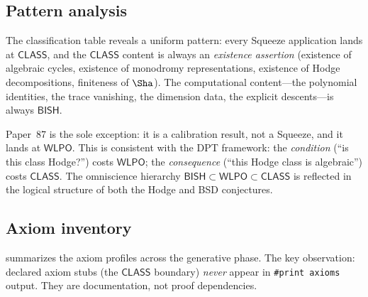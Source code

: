 \documentclass[11pt]{article}
\theoremstyle{plain}
\theoremstyle{definition}
\theoremstyle{remark}
\newcommand{\BISH}{\mathsf{BISH}}
\newcommand{\WLPO}{\mathsf{WLPO}}
\newcommand{\CLASS}{\mathsf{CLASS}}
\begin{document}
\subsection{Pattern analysis}

The classification table reveals a uniform pattern: every Squeeze
application lands at $\CLASS$, and the $\CLASS$ content is always
an \emph{existence assertion} (existence of algebraic cycles,
existence of monodromy representations, existence of Hodge
decompositions, finiteness of
$\Sha$).
The computational content---the polynomial
identities, the trace vanishing, the dimension data, the explicit
descents---is always $\BISH$.

Paper~87 is the sole exception: it is a calibration result, not a
Squeeze, and it lands at $\WLPO$.  This is consistent with the
DPT framework: the \emph{condition} (``is this class Hodge?'')
costs $\WLPO$; the \emph{consequence} (``this Hodge class is
algebraic'') costs $\CLASS$.  The omniscience hierarchy
$\BISH \subset \WLPO \subset \CLASS$ is reflected in the logical
structure of both the Hodge and BSD conjectures.

\subsection{Axiom inventory}

 summarizes the axiom profiles across
the generative phase.  The key observation: declared axiom stubs
(the $\CLASS$ boundary) \emph{never} appear in \texttt{\#print axioms}
output.  They are documentation, not proof dependencies.
\end{document}
